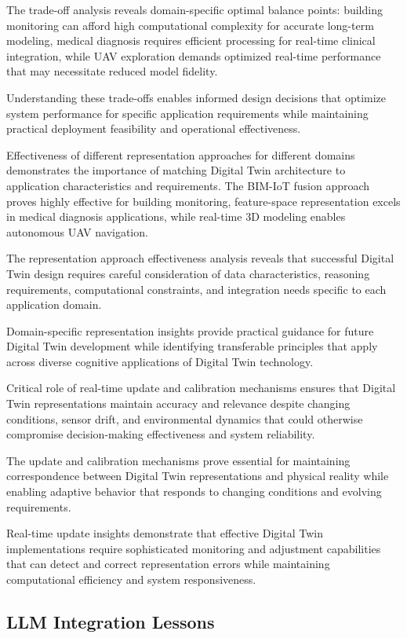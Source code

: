 The trade-off analysis reveals domain-specific optimal balance points: building monitoring can afford high computational complexity for accurate long-term modeling, medical diagnosis requires efficient processing for real-time clinical integration, while UAV exploration demands optimized real-time performance that may necessitate reduced model fidelity.

Understanding these trade-offs enables informed design decisions that optimize system performance for specific application requirements while maintaining practical deployment feasibility and operational effectiveness.

Effectiveness of different representation approaches for different domains demonstrates the importance of matching Digital Twin architecture to application characteristics and requirements. The BIM-IoT fusion approach proves highly effective for building monitoring, feature-space representation excels in medical diagnosis applications, while real-time 3D modeling enables autonomous UAV navigation.

The representation approach effectiveness analysis reveals that successful Digital Twin design requires careful consideration of data characteristics, reasoning requirements, computational constraints, and integration needs specific to each application domain.

Domain-specific representation insights provide practical guidance for future Digital Twin development while identifying transferable principles that apply across diverse cognitive applications of Digital Twin technology.

Critical role of real-time update and calibration mechanisms ensures that Digital Twin representations maintain accuracy and relevance despite changing conditions, sensor drift, and environmental dynamics that could otherwise compromise decision-making effectiveness and system reliability.

The update and calibration mechanisms prove essential for maintaining correspondence between Digital Twin representations and physical reality while enabling adaptive behavior that responds to changing conditions and evolving requirements.

Real-time update insights demonstrate that effective Digital Twin implementations require sophisticated monitoring and adjustment capabilities that can detect and correct representation errors while maintaining computational efficiency and system responsiveness.

\subsection{LLM Integration Lessons}

